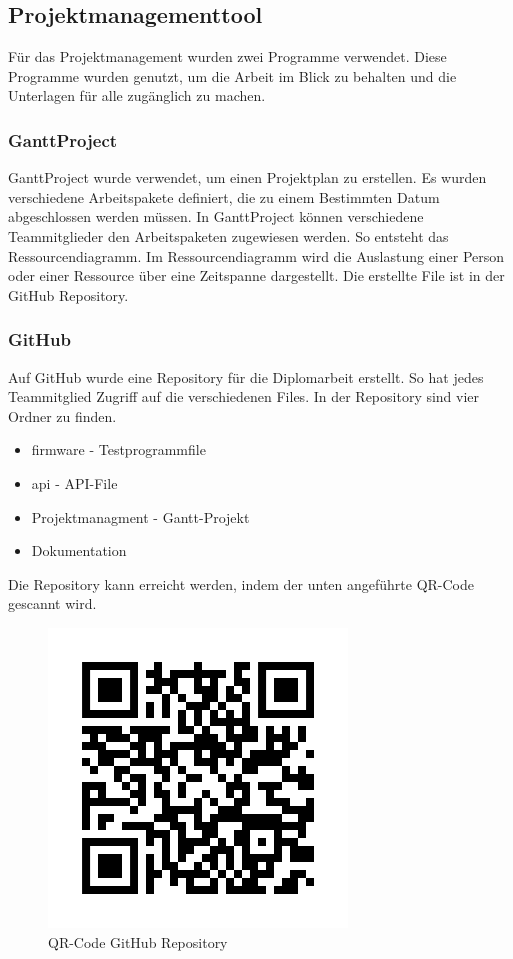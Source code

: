 \subsection{Projektmanagementtool}
Für das Projektmanagement wurden zwei Programme verwendet. Diese Programme wurden genutzt, um die Arbeit im Blick zu behalten und die Unterlagen für alle zugänglich zu machen. 

\subsubsection{GanttProject}
GanttProject\autocite{GanttProject} wurde verwendet, um einen Projektplan zu erstellen. Es wurden verschiedene Arbeitspakete definiert, die zu einem Bestimmten Datum abgeschlossen werden müssen. In GanttProject können verschiedene Teammitglieder den Arbeitspaketen zugewiesen werden. So entsteht das Ressourcendiagramm. Im Ressourcendiagramm wird die Auslastung einer Person oder einer Ressource über eine Zeitspanne dargestellt. Die erstellte File ist in der GitHub Repository.

\subsubsection{GitHub}
Auf GitHub wurde eine Repository für die Diplomarbeit erstellt. So hat jedes Teammitglied Zugriff auf die verschiedenen Files. In der Repository sind vier Ordner zu finden. 
\begin{itemize}
    \item firmware - Testprogrammfile
    \item api - API-File
    \item Projektmanagment - Gantt-Projekt
    \item Dokumentation 
\end{itemize}
\pagebreak
Die Repository kann erreicht werden, indem der unten angeführte QR-Code gescannt wird. 
\vspace{5mm}
\begin{figure}[H]
    \centering
    \includegraphics[scale=0.8]{image/QRCode.png}
    \caption{QR-Code GitHub Repository}
    \label{fig:enter-label}
\end{figure}